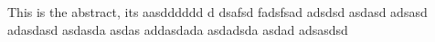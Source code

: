 This is the abstract, its aasdddddd d  dsafsd fadsfsad adsdsd  asdasd adsasd adasdasd asdasda asdas addasdada asdadsda asdad adsasdsd